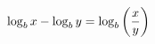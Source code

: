 \documentclass[preview]{standalone}
\begin{document}
\begin{align*}
\special{dvisvgm:raw <g id='unique000'>}\log_b x - \log_b y = \log_b \left( \frac{x}{y} \right)\special{dvisvgm:raw </g>}
\end{align*}
\end{document}
